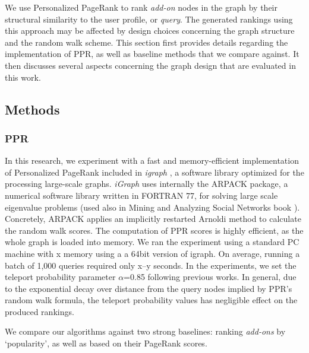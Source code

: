 \documentclass[11pt,oneside]{book}
\let\Oldsubsection\subsection
\renewcommand{\subsection}{\FloatBarrier\Oldsubsection}
\let\Oldsubsubsection\subsubsection
\renewcommand{\subsubsection}{\FloatBarrier\Oldsubsubsection}
\begin{document}
We use Personalized PageRank to rank {\it add-on} nodes in
the graph by their structural similarity to the user profile, or {\it
  query}. The generated rankings using this approach may be affected
by design choices concerning the graph structure and the random walk scheme. This section first provides details regarding the implementation of PPR, as well as baseline methods that we compare against. It then discusses several aspects concerning the graph design that are evaluated in this work.

\subsection{Methods}
\label{sec:methods}

\subsubsection{PPR} In this research, we experiment with a fast and memory-efficient implementation of Personalized PageRank included in {\it igraph} \citep{igraph}, a software library optimized for the processing large-scale graphs. {\it iGraph} uses internally the ARPACK package, a numerical software library written in FORTRAN 77, for solving large
scale eigenvalue problems (used also in Mining and Analyzing Social
Networks book \citep{ting2004minig}). Concretely, ARPACK applies an implicitly restarted Arnoldi method to calculate the random walk scores. The computation of PPR scores is highly efficient, as the whole graph is loaded into memory. We ran the experiment using a standard PC machine with x memory using a a 64bit version of igraph. On average, running a batch of 1,000 queries required only x--y seconds. In the experiments, we set the teleport probability parameter $\alpha$=0.85 following previous works. In general, due to the exponential decay over distance from the query nodes implied by PPR's random walk formula, the teleport probability values has negligible effect on the produced rankings.


We compare our algorithms against two strong baselines: ranking {\it add-ons} by `popularity', as well as based on their PageRank scores. 
\end{document}
